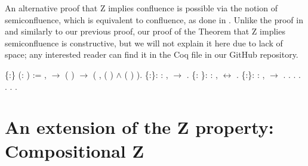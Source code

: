 An alternative proof that Z implies confluence is possible via the
    notion of semiconfluence, which is equivalent to confluence, as
    done in \cite{zproperty}. Unlike the proof in \cite{zproperty} and 
    similarly to our previous proof, our proof of the Theorem that 
    Z implies semiconfluence is constructive, but we
    will not explain it here due to lack of space; any
    interested reader can find it in the Coq file in our GitHub
    repository. \begin{coqdoccode}
\coqdocemptyline
\coqdocnoindent
{}  \{:\} (:  ) := \coqdockw{\ensuremath{\forall}}   ,    \ensuremath{\rightarrow} ( )   \ensuremath{\rightarrow} (\coqdoctac{\ensuremath{\exists}} , ( )   \ensuremath{\land} ( )  ).\coqdoceol
\coqdocemptyline
\coqdocnoindent
{}  \{:\}: \coqdockw{\ensuremath{\forall}} :  ,   \ensuremath{\rightarrow}  .\coqdoceol
\coqdocemptyline
\coqdocnoindent
{}  \{: \}: \coqdockw{\ensuremath{\forall}} :  ,   \ensuremath{\leftrightarrow}  .\coqdoceol
\coqdocemptyline
\coqdocnoindent
{}  \{:\}: \coqdockw{\ensuremath{\forall}} :  ,   \ensuremath{\rightarrow}  .\coqdoceol
\coqdocnoindent
{}.\coqdoceol
\coqdocindent{1.00em}
  .\coqdoceol
\coqdocindent{1.00em}
 .\coqdoceol
\coqdocindent{1.00em}
  .\coqdoceol
\coqdocindent{1.00em}
 .\coqdoceol
\coqdocnoindent
{}.\coqdoceol
\coqdocemptyline
\end{coqdoccode}
\section{An extension of the Z property: Compositional Z}




